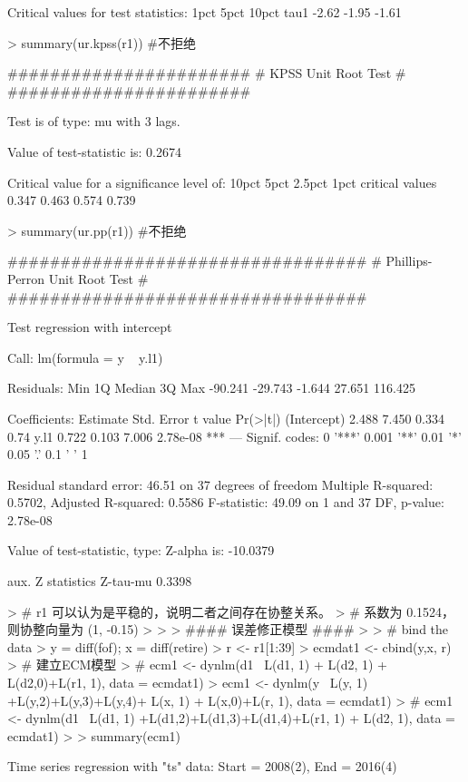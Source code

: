 \documentclass{article}
\begin{document}
\begin{Schunk}
\begin{Soutput}
Critical values for test statistics: 
      1pct  5pct 10pct
tau1 -2.62 -1.95 -1.61
\end{Soutput}
\begin{Sinput}
> summary(ur.kpss(r1)) #不拒绝
\end{Sinput}
\begin{Soutput}
####################### 
# KPSS Unit Root Test # 
####################### 

Test is of type: mu with 3 lags. 

Value of test-statistic is: 0.2674 

Critical value for a significance level of: 
                10pct  5pct 2.5pct  1pct
critical values 0.347 0.463  0.574 0.739
\end{Soutput}
\begin{Sinput}
> summary(ur.pp(r1)) #不拒绝
\end{Sinput}
\begin{Soutput}
################################## 
# Phillips-Perron Unit Root Test # 
################################## 

Test regression with intercept 


Call:
lm(formula = y ~ y.l1)

Residuals:
    Min      1Q  Median      3Q     Max 
-90.241 -29.743  -1.644  27.651 116.425 

Coefficients:
            Estimate Std. Error t value Pr(>|t|)    
(Intercept)    2.488      7.450   0.334     0.74    
y.l1           0.722      0.103   7.006 2.78e-08 ***
---
Signif. codes:  0 '***' 0.001 '**' 0.01 '*' 0.05 '.' 0.1 ' ' 1

Residual standard error: 46.51 on 37 degrees of freedom
Multiple R-squared:  0.5702,	Adjusted R-squared:  0.5586 
F-statistic: 49.09 on 1 and 37 DF,  p-value: 2.78e-08


Value of test-statistic, type: Z-alpha  is: -10.0379 

         aux. Z statistics
Z-tau-mu            0.3398
\end{Soutput}
\begin{Sinput}
> # r1 可以认为是平稳的，说明二者之间存在协整关系。
> # 系数为 0.1524，则协整向量为 (1, -0.15)
> 
> 
> #### 误差修正模型 ####
> 
> # bind the data
> y = diff(fof); x = diff(retire)
> r <- r1[1:39]
> ecmdat1 <- cbind(y,x, r)
> # 建立ECM模型
> # ecm1 <- dynlm(d1~  L(d1, 1) + L(d2, 1) + L(d2,0)+L(r1, 1), data = ecmdat1)
> ecm1 <- dynlm(y~  L(y, 1)  +L(y,2)+L(y,3)+L(y,4)+ L(x, 1) + L(x,0)+L(r, 1), data = ecmdat1)
> # ecm1 <- dynlm(d1~  L(d1, 1)  +L(d1,2)+L(d1,3)+L(d1,4)+L(r1, 1) + L(d2, 1), data = ecmdat1)
> 
> summary(ecm1)
\end{Sinput}
\begin{Soutput}
Time series regression with "ts" data:
Start = 2008(2), End = 2016(4)


\end{Soutput}
\end{Schunk}
\end{document}
